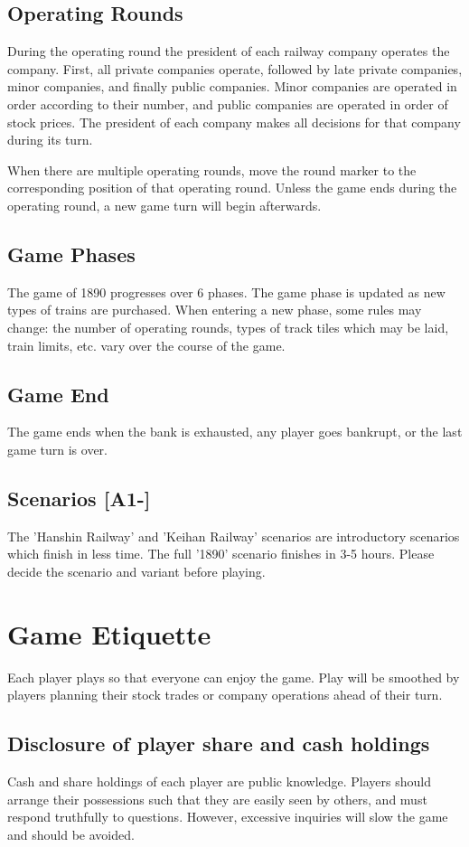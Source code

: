 \documentclass{article}
\begin{document}
\begin{CJK}{UTF8}{min}
\begin{multicols}{2}
\subsection{Operating Rounds}
During the operating round the president of each railway company
operates the company. First, all private companies operate, followed
by late private companies, minor companies, and finally public
companies. Minor companies are operated in order according to their
number, and public companies are operated in order of stock
prices. The president of each company makes all decisions for that
company during its turn.

When there are multiple operating rounds, move the round marker to the
corresponding position of that operating round. Unless the game ends during
the operating round, a new game turn will begin afterwards.


\subsection{Game Phases}
The game of 1890 progresses over 6 phases. The game phase is updated
as new types of trains are purchased. When entering a new phase, some
rules may change: the number of operating rounds, types of track tiles
which may be laid, train limits, etc. vary over the course of the
game.


\subsection{Game End}
The game ends when the bank is exhausted, any player goes bankrupt,
or the last game turn is over.


\subsection{Scenarios [A1-]}
The 'Hanshin Railway' and 'Keihan Railway' scenarios are introductory
scenarios which finish in less time. The full '1890' scenario finishes
in 3-5 hours. Please decide the scenario and variant before playing.


\section{Game Etiquette}
Each player plays so that everyone can enjoy the game. Play will be
smoothed by players planning their stock trades or company operations
ahead of their turn.


\subsection{Disclosure of player share and cash holdings}
\label{player-cash}
Cash and share holdings of each player are public knowledge. Players
should arrange their possessions such that they are easily seen by
others, and must respond truthfully to questions. However, excessive
inquiries will slow the game and should be avoided.



\end{multicols}
\end{CJK}
\end{document}
